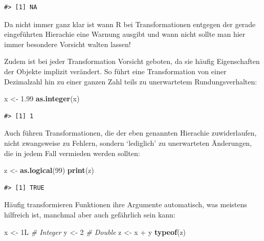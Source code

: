 \documentclass[]{tufte-book}
\newenvironment{Shaded}{}{}
\newcommand{\KeywordTok}[1]{\textcolor[rgb]{0.00,0.44,0.13}{\textbf{#1}}}
\newcommand{\DecValTok}[1]{\textcolor[rgb]{0.25,0.63,0.44}{#1}}
\newcommand{\FloatTok}[1]{\textcolor[rgb]{0.25,0.63,0.44}{#1}}
\newcommand{\StringTok}[1]{\textcolor[rgb]{0.25,0.44,0.63}{#1}}
\newcommand{\CommentTok}[1]{\textcolor[rgb]{0.38,0.63,0.69}{\textit{#1}}}
\newcommand{\OperatorTok}[1]{\textcolor[rgb]{0.40,0.40,0.40}{#1}}
\newcommand{\NormalTok}[1]{#1}
\begin{document}
\begin{verbatim}
#> [1] NA
\end{verbatim}

Da nicht immer ganz klar ist wann R bei Transformationen entgegen der
gerade eingeführten Hierachie eine Warnung ausgibt und wann nicht sollte
man hier immer besondere Vorsicht walten lassen!

Zudem ist bei jeder Transformation Vorsicht geboten, da sie häufig
Eigenschaften der Objekte implizit verändert. So führt eine
Transformation von einer Dezimalzahl hin zu einer ganzen Zahl teils zu
unerwartetem Rundungsverhalten:

\begin{Shaded}
\begin{Highlighting}[]
\NormalTok{x <-}\StringTok{ }\FloatTok{1.99}
\KeywordTok{as.integer}\NormalTok{(x)}
\end{Highlighting}
\end{Shaded}

\begin{verbatim}
#> [1] 1
\end{verbatim}

Auch führen Transformationen, die der eben genannten Hierachie
zuwiderlaufen, nicht zwangsweise zu Fehlern, sondern `lediglich' zu
unerwarteten Änderungen, die in jedem Fall vermieden werden sollten:

\begin{Shaded}
\begin{Highlighting}[]
\NormalTok{z <-}\StringTok{ }\KeywordTok{as.logical}\NormalTok{(}\DecValTok{99}\NormalTok{)}
\KeywordTok{print}\NormalTok{(z)}
\end{Highlighting}
\end{Shaded}

\begin{verbatim}
#> [1] TRUE
\end{verbatim}

Häufig transformieren Funktionen ihre Argumente automatisch, was
meistens hilfreich ist, manchmal aber auch gefährlich sein kann:

\begin{Shaded}
\begin{Highlighting}[]
\NormalTok{x <-}\StringTok{ }\NormalTok{1L  }\CommentTok{# Integer}
\NormalTok{y <-}\StringTok{ }\DecValTok{2}  \CommentTok{# Double}
\NormalTok{z <-}\StringTok{ }\NormalTok{x }\OperatorTok{+}\StringTok{ }\NormalTok{y}
\KeywordTok{typeof}\NormalTok{(z)}
\end{Highlighting}
\end{Shaded}
\end{document}
